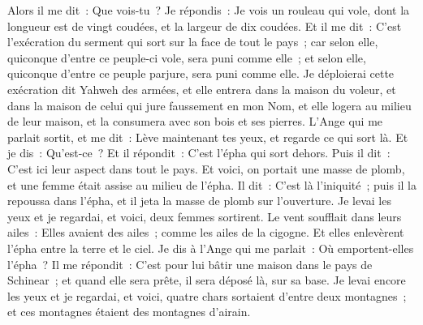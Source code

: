 \begin{multicols}{2}
Alors il me dit~: Que vois-tu~? Je répondis~: Je vois un rouleau qui vole, dont la longueur est de vingt coudées, et la largeur de dix coudées.
Et il me dit~: C'est l'exécration du serment qui sort sur la face de tout le pays~; car selon elle, quiconque d'entre ce peuple-ci vole, sera puni comme elle~; et selon elle, quiconque d'entre ce peuple parjure, sera puni comme elle.
Je déploierai cette exécration dit Yahweh des armées, et elle entrera dans la maison du voleur, et dans la maison de celui qui jure faussement en mon Nom, et elle logera au milieu de leur maison, et la consumera avec son bois et ses pierres.
L'Ange qui me parlait sortit, et me dit~: Lève maintenant tes yeux, et regarde ce qui sort là.
Et je dis~: Qu'est-ce~? Et il répondit~: C'est l'épha qui sort dehors. Puis il dit~: C'est ici leur aspect dans tout le pays.
Et voici, on portait une masse de plomb, et une femme était assise au milieu de l'épha.
Il dit~: C'est là l'iniquité~; puis il la repoussa dans l'épha, et il jeta la masse de plomb sur l'ouverture.
Je levai les yeux et je regardai, et voici, deux femmes sortirent. Le vent soufflait dans leurs ailes~: Elles avaient des ailes~; comme les ailes de la cigogne. Et elles enlevèrent l'épha entre la terre et le ciel.
Je dis à l'Ange qui me parlait~: Où emportent-elles l'épha~?
Il me répondit~: C'est pour lui bâtir une maison dans le pays de Schinear~; et quand elle sera prête, il sera déposé là, sur sa base.
\VerseOne{}Je levai encore les yeux et je regardai, et voici, quatre chars sortaient d'entre deux montagnes~; et ces montagnes étaient des montagnes d'airain.

\end{multicols}
